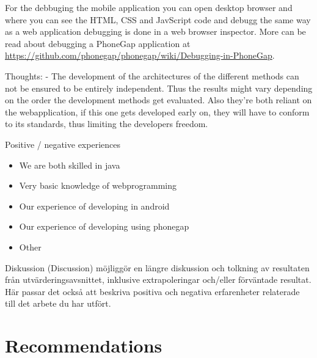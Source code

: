 For the debbuging the mobile application you can open desktop browser and where you can see the HTML, CSS and JavScript code and debugg the same way as a web application debugging is done in a web browser inspector. More can be read about debugging a PhoneGap application at \url{https://github.com/phonegap/phonegap/wiki/Debugging-in-PhoneGap}.



Thoughts:
 - The development of the architectures of the different methods can not be ensured to be entirely independent. Thus the results might vary depending on the order the development methods get evaluated. Also they're both reliant on the webapplication, if this one gets developed early on, they will have to conform to its standards, thus limiting the developers freedom. 

Positive / negative experiences
\begin{itemize}
    \item We are both skilled in java
    \item Very basic knowledge of webprogramming
    \item Our experience of developing in android
    \item Our experience of developing using phonegap
    \item Other
\end{itemize}

Diskussion (Discussion) möjliggör en längre diskussion och tolkning av resultaten från utvärderingsavsnittet, inklusive extrapoleringar och/eller förväntade resultat. Här passar det också att beskriva positiva och negativa erfarenheter relaterade till det arbete du har utfört.

\section{Recommendations}
\fi